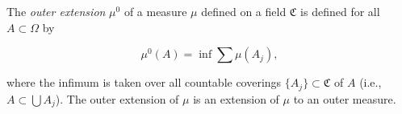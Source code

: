 The \textit{outer extension} $\mu^0$ of a measure $\mu$ defined on a field $\mathfrak{C}$ is defined for all $A \subset \Omega$ by

$$\mu^0(A) = \inf \sum \mu(A_j),$$

where the infimum is taken over all countable coverings $\{A_j\} \subset \mathfrak{C}$ of $A$ (i.e., $A \subset \bigcup A_j$). The outer extension of $\mu$ is an extension of $\mu$ to an outer measure.
